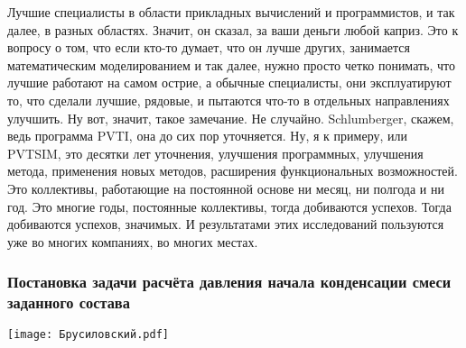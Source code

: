\documentclass[main.tex]{subfiles}
\begin{document}
Лучшие специалисты в области прикладных вычислений и программистов, и так далее, в разных областях.
Значит, он сказал, за ваши деньги любой каприз.
Это к вопросу о том, что если кто-то думает, что он лучше других, занимается математическим моделированием и так далее, нужно просто четко понимать, что лучшие работают на самом острие, а обычные специалисты, они эксплуатируют то, что сделали лучшие, рядовые, и пытаются что-то в отдельных направлениях улучшить.
Ну вот, значит, такое замечание.
Не случайно.
Schlumberger, скажем, ведь программа PVTI, она до сих пор уточняется.
Ну, я к примеру, или PVTSIM, это десятки лет уточнения, улучшения программных, улучшения метода, применения новых методов, расширения функциональных возможностей.
Это коллективы, работающие на постоянной основе ни месяц, ни полгода и ни год.
Это многие годы, постоянные коллективы, тогда добиваются успехов.
Тогда добиваются успехов, значимых.
И результатами этих исследований пользуются уже во многих компаниях, во многих местах.

\subsubsection{Постановка задачи расчёта давления начала конденсации смеси заданного состава}

\begin{center}
\texttt{[image: Брусиловский.pdf]}
\end{center}
\end{document}
